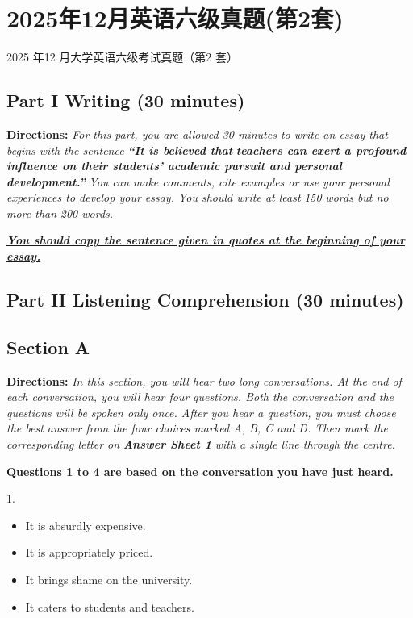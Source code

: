 \documentclass[UTF8,11pt]{ctexart}
\begin{document}
\section*{2025年12月英语六级真题(第2套)}
2025 年12 月大学英语六级考试真题（第2 套）


\subsection*{\textbf{Part I Writing} \textbf{(30 minutes)}}


\textbf{Directions:}\textit{ For this part, you are allowed 30 minutes to write an essay that begins with the sentence }\textbf{\textit{“It is believed that}} \textbf{\textit{teachers can exert a profound influence on their students’ academic pursuit and personal development.”}}\textit{ You can} \textit{make comments, cite examples or use your personal experiences to develop your essay. You should write at least }\textit{\uline{150}} \textit{words but no more than }\textit{\uline{200 }}\textit{words.}


\textbf{\textit{\uline{You should copy the sentence given in quotes at the beginning of your essay.}}}


\subsection*{\textbf{Part II} \textbf{Listening Comprehension} \textbf{(30 minutes)}}


\subsection*{\textbf{Section A}}


\textbf{Directions:} \textit{In this section, you will hear two long conversations. At the end of each conversation, you will hear four} \textit{questions. Both the conversation and the questions will be spoken only once. After you hear a question, you must choose} \textit{the best answer from the four choices marked A, B, C and D. Then mark the corresponding letter on }\textbf{\textit{Answer Sheet 1}} \textit{with a single line through the centre.}


\textbf{Questions 1 to 4 are based on the conversation you have just heard.}


1.


\begin{itemize}[leftmargin=2em,itemsep=.2em,topsep=.4em]\item[A.] It is absurdly expensive.
\item[B.] It is appropriately priced.
\item[C.] It brings shame on the university.
\item[D.] It caters to students and teachers.
\end{itemize}
\end{document}
